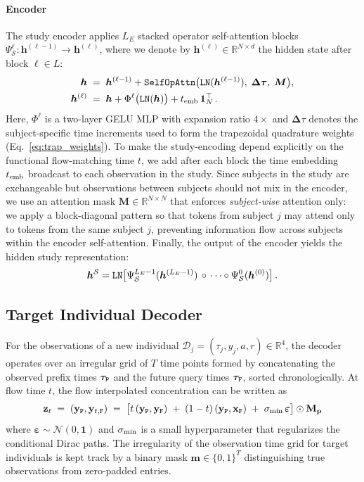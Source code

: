 \paragraph{Encoder}
The study encoder applies $L_E$ stacked operator self-attention blocks $\Psi_\mathcal{S}^{\ell}:\bm{h}^{(\ell-1)}\to\bm{h}^{(\ell)}$, where we denote by ${\bm h}^{(\ell)} \in \mathbb{R}^{N \times d}$ the hidden state after block $\ell\in L$:
\begin{align}
    \bm h &\;=\; \bm{h}^{(\ell-1)}
    + \mathtt{SelfOpAttn}\bigl(\mathtt{LN}(\bm{h}^{(\ell-1)}),\;\bm{\Delta\tau},\;\bm{M}\bigr),
    \label{eq:enc_sa}\\
    \bm{h}^{(\ell)} &\;=\; \bm{h} + \Phi^{\ell}\bigl({\tt LN}(\bm{h})\bigr) + t_{\rm emb}\,\bm{1}^\top_N\,.
    \label{eq:enc_ffn}
\end{align}
Here, $\Phi^{\ell}$ is a two-layer GELU MLP with expansion ratio $4\times$ and $\bm\Delta\tau$ denotes the subject-specific time increments used to form the trapezoidal quadrature weights (Eq.~\eqref{eq:trap_weights}). To make the study-encoding depend explicitly on the functional flow-matching time $t$, we add after each block the time embedding $t_{\rm emb}$ broadcast to each observation in the study. Since subjects in the study are exchangeable but observations between subjects should not mix in the encoder, we use an attention mask $\bm M\in\mathbb{R}^{N\times N}$ that enforces \emph{subject-wise} attention only: we apply a block-diagonal pattern so that tokens from subject \(j\) may attend only to tokens from the same subject \(j\), preventing information flow across subjects within the encoder self-attention. Finally, the output of the encoder yields the hidden study representation:
\begin{equation}
\bm h^{\mathcal S} = {\tt LN}\bigl[\Psi^{L_E-1}_\mathcal{S}(\bm h^{(L_E-1)})\,\circ\,\cdots\circ\Psi^0_\mathcal{S}(\bm h^{(0)})\bigr]\,.
\end{equation}

\subsection{Target Individual Decoder}
\label{app:decoder}
For the observations of a new individual $\mathcal{D}_j = (\tau_j, y_j, a, r)\in \mathbb{R}^4$,
the decoder operates over an irregular grid of $T$ time points formed by concatenating the
observed prefix times $\boldsymbol{\tau}_{\tt P}$ and the future query
times $\boldsymbol{\tau}_{\tt F}$, sorted chronologically.
At flow time $t$, the flow interpolated concentration can be written as
\begin{equation}
    \mathbf{z}_t \;= \;({\bf y}_{\tt P}, {\bf y}_{t,\tt F}) \;= \;\bigl[t\,({\bf y}_{\tt P}, {\bf y}_{\tt F})\; +\; (1-t)\,({\bf y}_{\tt P}, \bf x_{\tt F})\; + \;\sigma_{\min}\,\bm \varepsilon\bigr] \odot \mathbf{M}_p
    \label{eq:zt_def}
\end{equation}
where $\bm\varepsilon \sim \mathcal{N}(0,\bm 1)$ and $\sigma_{\rm min}$ is a small hyperparameter that regularizes the conditional Dirac paths. The irregularity of the observation time grid for target individuals is kept track by a binary mask $\bm{m}\in \{0,1\}^T$ distinguishing true observations from zero-padded entries.

